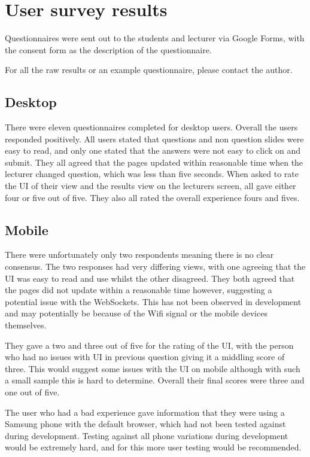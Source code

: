 \chapter{User survey results}
\label{appendix:user-results}
Questionnaires were sent out to the students and lecturer via Google Forms, with the consent form as the description of the questionnaire.

For all the raw results or an example questionnaire, please contact the author.

\section{Desktop}
There were eleven questionnaires completed for desktop users. Overall the users responded positively. All users stated that questions and non question slides were easy to read, and only one stated that the answers were not easy to click on and submit. They all agreed that the pages updated within reasonable time when the lecturer changed question, which was less than five seconds. When asked to rate the UI of their view and the results view on the lecturers screen, all gave either four or five out of five. They also all rated the overall experience fours and fives.
\section{Mobile}
There were unfortunately only two respondents meaning there is no clear consensus. The two responses had very differing views, with one agreeing that the UI was easy to read and use whilst the other disagreed. They both agreed that the pages did not update within a reasonable time however, suggesting a potential issue with the WebSockets. This has not been observed in development and may potentially be because of the Wifi signal or the mobile devices themselves.

They gave a two and three out of five for the rating of the UI, with the person who had no issues with UI in previous question giving it a middling score of three. This would suggest some issues with the UI on mobile although with such a small sample this is hard to determine. Overall their final scores were three and one out of five. 

The user who had a bad experience gave information that they were using a Samsung phone with the default browser, which had not been tested against during development. Testing against all phone variations during development would be extremely hard, and for this more user testing would be recommended.
